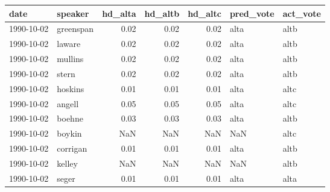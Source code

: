 \begin{tabular}{llrrrll}
\toprule
       date &    speaker &  hd\_alta &  hd\_altb &  hd\_altc & pred\_vote & act\_vote \\
\midrule
 1990-10-02 &  greenspan &     0.02 &     0.02 &     0.02 &      alta &     altb \\
 1990-10-02 &     laware &     0.02 &     0.02 &     0.02 &      alta &     altb \\
 1990-10-02 &    mullins &     0.02 &     0.02 &     0.02 &      alta &     altb \\
 1990-10-02 &      stern &     0.02 &     0.02 &     0.02 &      alta &     altb \\
 1990-10-02 &    hoskins &     0.01 &     0.01 &     0.01 &      alta &     altc \\
 1990-10-02 &     angell &     0.05 &     0.05 &     0.05 &      alta &     altc \\
 1990-10-02 &     boehne &     0.03 &     0.03 &     0.03 &      alta &     altb \\
 1990-10-02 &     boykin &      NaN &      NaN &      NaN &       NaN &     altc \\
 1990-10-02 &   corrigan &     0.01 &     0.01 &     0.01 &      alta &     altb \\
 1990-10-02 &     kelley &      NaN &      NaN &      NaN &       NaN &     altb \\
 1990-10-02 &      seger &     0.01 &     0.01 &     0.01 &      alta &     alta \\
\bottomrule
\end{tabular}
